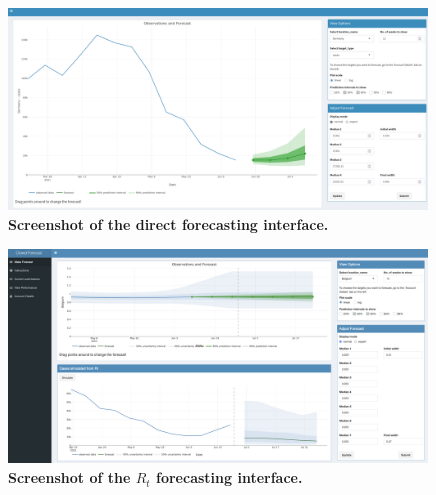 \documentclass[10pt,a4paper,twocolumn]{article}
\begin{document}
\begin{figure}
\centering
\includegraphics[width=0.99\textwidth]{../output/figures/screenshot-crowd-classical.png}
\caption{\bf{Screenshot of the direct forecasting interface.}}
\label{fig:screenshot-classical}
\end{figure}


\begin{figure}
\centering
\includegraphics[width=0.99\textwidth]{../output/figures/screenshot-crowd-rt-app.png}
\caption{\bf{Screenshot of the $R_t$ forecasting interface.}}
\label{fig:screenshot-rt}
\end{figure}
\end{document}
